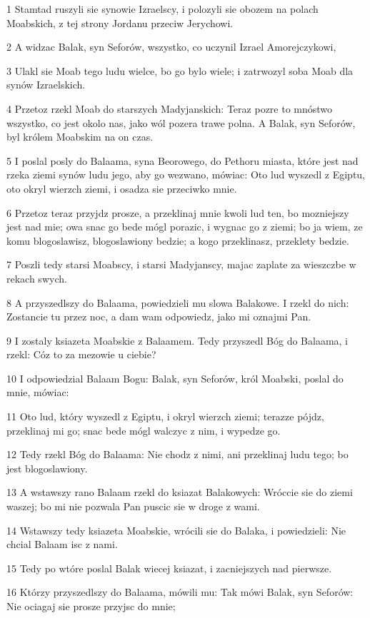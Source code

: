 \par 1 Stamtad ruszyli sie synowie Izraelscy, i polozyli sie obozem na polach Moabskich, z tej strony Jordanu przeciw Jerychowi.
\par 2 A widzac Balak, syn Seforów, wszystko, co uczynil Izrael Amorejczykowi,
\par 3 Ulakl sie Moab tego ludu wielce, bo go bylo wiele; i zatrwozyl soba Moab dla synów Izraelskich.
\par 4 Przetoz rzekl Moab do starszych Madyjanskich: Teraz pozre to mnóstwo wszystko, co jest okolo nas, jako wól pozera trawe polna. A Balak, syn Seforów, byl królem Moabskim na on czas.
\par 5 I poslal posly do Balaama, syna Beorowego, do Pethoru miasta, które jest nad rzeka ziemi synów ludu jego, aby go wezwano, mówiac: Oto lud wyszedl z Egiptu, oto okryl wierzch ziemi, i osadza sie przeciwko mnie.
\par 6 Przetoz teraz przyjdz prosze, a przeklinaj mnie kwoli lud ten, bo mozniejszy jest nad mie; owa snac go bede mógl porazic, i wygnac go z ziemi; bo ja wiem, ze komu blogoslawisz, blogoslawiony bedzie; a kogo przeklinasz, przeklety bedzie.
\par 7 Poszli tedy starsi Moabscy, i starsi Madyjanscy, majac zaplate za wieszczbe w rekach swych.
\par 8 A przyszedlszy do Balaama, powiedzieli mu slowa Balakowe. I rzekl do nich: Zostancie tu przez noc, a dam wam odpowiedz, jako mi oznajmi Pan.
\par 9 I zostaly ksiazeta Moabskie z Balaamem. Tedy przyszedl Bóg do Balaama, i rzekl: Cóz to za mezowie u ciebie?
\par 10 I odpowiedzial Balaam Bogu: Balak, syn Seforów, król Moabski, poslal do mnie, mówiac:
\par 11 Oto lud, który wyszedl z Egiptu, i okryl wierzch ziemi; terazze pójdz, przeklinaj mi go; snac bede mógl walczyc z nim, i wypedze go.
\par 12 Tedy rzekl Bóg do Balaama: Nie chodz z nimi, ani przeklinaj ludu tego; bo jest blogoslawiony.
\par 13 A wstawszy rano Balaam rzekl do ksiazat Balakowych: Wróccie sie do ziemi waszej; bo mi nie pozwala Pan puscic sie w droge z wami.
\par 14 Wstawszy tedy ksiazeta Moabskie, wrócili sie do Balaka, i powiedzieli: Nie chcial Balaam isc z nami.
\par 15 Tedy po wtóre poslal Balak wiecej ksiazat, i zacniejszych nad pierwsze.
\par 16 Którzy przyszedlszy do Balaama, mówili mu: Tak mówi Balak, syn Seforów: Nie ociagaj sie prosze przyjsc do mnie;
